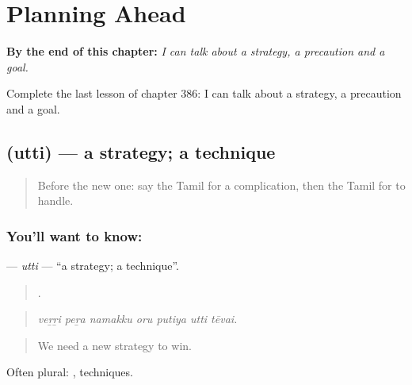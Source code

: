 
\chapter{Planning Ahead}
\label{ch:ta-planning-ahead}

\begin{chapteropening}
\textbf{By the end of this chapter:} \emph{I can talk about a strategy, a precaution and a goal.}

Complete the last lesson of chapter 386: I can talk about a strategy, a precaution and a goal.
\end{chapteropening}

\section[\texorpdfstring{\ta{உத்தி} (utti)}{உத்தி (utti)}]{ (utti) — a strategy; a technique}

\label{lesson:TA-C386-utti}



\begin{quote}
Before the new one: say the Tamil for a complication, then the Tamil for to handle.
\end{quote}

\subsection*{You'll want to know: }
\textbf{} — \emph{utti} — \textquotedblleft{}a strategy; a technique\textquotedblright{}.

\begin{quote}
      .
\end{quote}

\begin{quote}
\emph{veṟṟi peṟa namakku oru putiya utti tēvai.}
\end{quote}

\begin{quote}
We need a new strategy to win.
\end{quote}

Often plural: , techniques.

